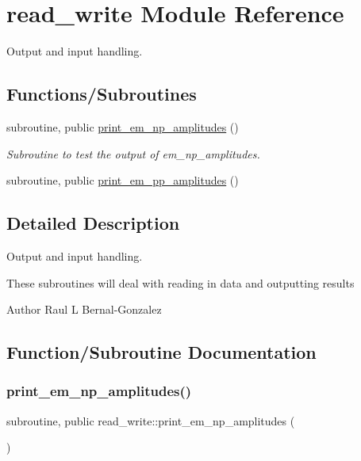 \hypertarget{namespaceread__write}{}\section{read\+\_\+write Module Reference}
\label{namespaceread__write}


Output and input handling.  


\subsection*{Functions/\+Subroutines}
\begin{DoxyCompactItemize}
\item 
subroutine, public \hyperlink{namespaceread__write_a730f5d68add5c828fda48d2408f8c275}{print\+\_\+em\+\_\+np\+\_\+amplitudes} ()
\begin{DoxyCompactList}\small\item\em Subroutine to test the output of em\+\_\+np\+\_\+amplitudes. \end{DoxyCompactList}\item 
subroutine, public \hyperlink{namespaceread__write_a72cf75ecd9db83c3514541af9b3bf5b6}{print\+\_\+em\+\_\+pp\+\_\+amplitudes} ()
\end{DoxyCompactItemize}


\subsection{Detailed Description}
Output and input handling. 

These subroutines will deal with reading in data and outputting results

\begin{DoxyAuthor}{Author}
Raul L Bernal-\/\+Gonzalez 
\end{DoxyAuthor}


\subsection{Function/\+Subroutine Documentation}
\mbox{\label{namespaceread__write_a730f5d68add5c828fda48d2408f8c275}} 
\subsubsection{\texorpdfstring{print\+\_\+em\+\_\+np\+\_\+amplitudes()}{print\_em\_np\_amplitudes()}}
{\footnotesize\ttfamily subroutine, public read\+\_\+write\+::print\+\_\+em\+\_\+np\+\_\+amplitudes (\begin{DoxyParamCaption}{ }\end{DoxyParamCaption})}



